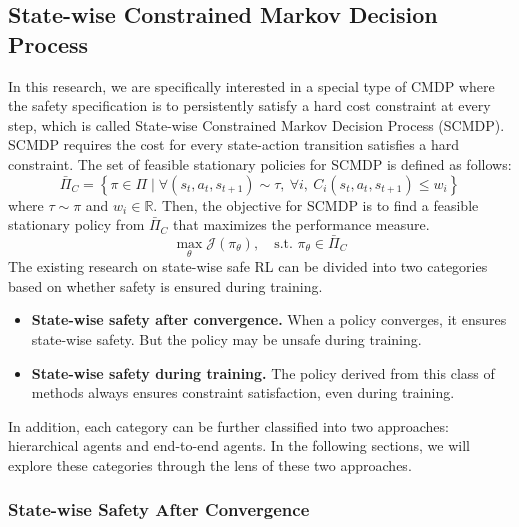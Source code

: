 \subsection{State-wise Constrained Markov Decision Process}
In this research, we are specifically interested in a special type of CMDP where the safety specification is to persistently satisfy a hard cost constraint at every step, which is called State-wise Constrained Markov Decision Process (SCMDP).
SCMDP requires the cost for every state-action transition satisfies a hard constraint.
The set of feasible stationary policies for SCMDP is defined as follows:
\begin{equation}
	\bar{\Pi}_{C} = 
	\left\{ 
		\pi \in \Pi \mid \forall (s_{t}, a_{t}, s_{t+1}) \sim \tau, \ 
		\forall i, \ C_{i}(s_{t}, a_{t}, s_{t+1}) \leq w_{i} 
	\right\}
\end{equation}
where $\tau \sim \pi$ and $w_i \in \mathbb{R}$.
Then, the objective for SCMDP is to find a feasible stationary policy from $\bar{\Pi}_C$ that maximizes the performance measure.
\begin{equation}
	\max_{\theta} \mathcal{J}(\pi_{\theta}), \quad \text{s.t. } \pi_{\theta} \in \bar{\Pi}_{C}
\end{equation}
The existing research on state-wise safe RL can be divided into two categories based on whether safety is ensured during training.
\begin{itemize}
    \item \textbf{State-wise safety after convergence.} When a policy converges, it ensures state-wise safety. But the policy may be unsafe during training.
    \item \textbf{State-wise safety during training.} The policy derived from this class of methods always ensures constraint satisfaction, even during training.
\end{itemize}
In addition, each category can be further classified into two approaches: hierarchical agents and end-to-end agents.
In the following sections, we will explore these categories through the lens of these two approaches.

\subsubsection{State-wise Safety After Convergence}

